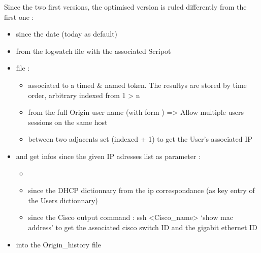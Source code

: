 \documentclass[letterpaper,10pt,english]{sphinxmanual}
\begin{document}
\sphinxAtStartPar
Since the two first versions, the optimised version is ruled differently from the first one :
\begin{itemize}
\item {} 
\sphinxAtStartPar
{} since the date (today as default)

\item {} 
\sphinxAtStartPar
{} from the logwatch file with the associated  Scripot

\item {} 
\sphinxAtStartPar
{} file :
\begin{itemize}
\item {} 
\sphinxAtStartPar
{} associated to a timed \& named token. The resultys are stored by time order, arbitrary indexed from 1 \sphinxhyphen{}\textgreater{} n

\item {} 
\sphinxAtStartPar
{} from the full Origin user name (with form ) =\textgreater{} Allow multiple users sessions on the same host

\item {} 
\sphinxAtStartPar
{} between two adjacents set (indexed +\sphinxhyphen{} 1) to get the User’s associated IP

\end{itemize}

\item {} 
\sphinxAtStartPar
{} and get infos since the given IP adresses list as parameter :
\begin{itemize}
\item {} 
\sphinxAtStartPar
{}

\item {} 
\sphinxAtStartPar
{} since the DHCP dictionnary from the ip correspondance (as key entry of the Users dictionnary)

\item {} 
\sphinxAtStartPar
{} since the Cisco output command : ssh \textless{}Cisco\_name\textgreater{} ‘show mac address’ to get the associated cisco switch ID and the gigabit ethernet ID

\end{itemize}

\item {} 
\sphinxAtStartPar
{} into the Origin\_history file

\end{itemize}
\end{document}

